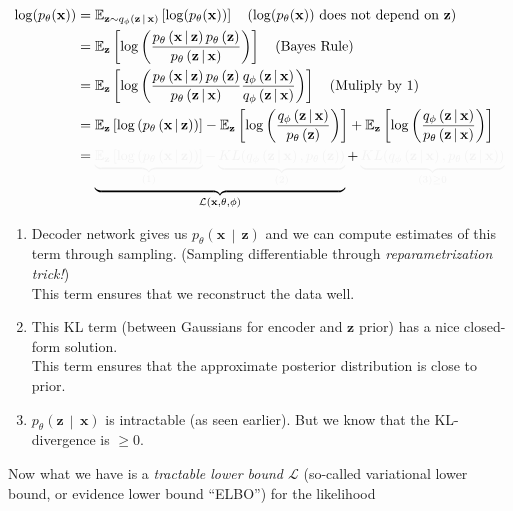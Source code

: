 \documentclass[a2paper,4pt]{extarticle}
\makeatletter
\newcommand{\tcb}[1]{\textcolor{lighttext}{#1}}
\newcommand{\tcb}[1]{\textcolor{blue}{#1}}
\def\mc#1#{\@mc{#1}}
\def\@mc#1#2#3{%
  \protect\leavevmode
  \begingroup
    \color#1{#2}#3%
  \endgroup
}
\newcommand{\mcr}[1]{\mc{lighttext}{#1}}
\newcommand{\mcg}[1]{\mc{lighttext}{#1}}
\newcommand{\mcr}[1]{\mc{red}{#1}}
\newcommand{\mcg}[1]{\mc{green}{#1}}
\newcommand{\cL}{\mathcal{L}}
\newcommand{\Dist}[2]{#1\left( #2 \right)}
\newcommand{\cDist}[3]{#1\left( #2 \,\middle|\, #3 \right)}
\newcommand{\Exp}[2][]{{\mathbb{E}_{#1}}\left[ #2
\right]}
\renewcommand{\vec}[1]{\mathbf{#1}}
\newcommand{\vx}{\vec{x}}
\newcommand{\vz}{\vec{z}}
\makeatother
\begin{document}
\begin{landscape}
\begin{multicols*}{7}
\begin{gather*}
\begin{align*}
\log(p_\theta(\vx))
&=\Exp[\vz\sim \cDist{q_\phi}{\vz}{\vx}]{\log(p_\theta(\vx))}
\quad (\log(p_\theta(\vx))\text{ does not depend on $\vz$})
\\
&=
\Exp[\vz]{
\log\left(
\frac{
\cDist{p_\theta}{\vx}{\vz}\Dist{p_\theta}{\vz}
}{
\cDist{p_\theta}{\vz}{\vx}
}
\right)
}
\quad(\text{Bayes Rule})
\\
&=
\Exp[\vz]{
\log\left(
\frac{
\cDist{p_\theta}{\vx}{\vz}\Dist{p_\theta}{\vz}
}{
\cDist{p_\theta}{\vz}{\vx}
}
\frac{\cDist{q_\phi}{\vz}{\vx}}{\cDist{q_\phi}{\vz}{\vx}}
\right)
}
\quad(\text{Muliply by 1})
\\
&=
\Exp[\vz]{\log\left(\cDist{p_\theta}{\vx}{\vz}\right)}
-
\Exp[\vz]{\log\left(
\frac{
\cDist{q_\phi}{\vz}{\vx}
}{
\Dist{p_\theta}{\vz}
}
\right)}
+
\Exp[\vz]{\log\left(
\frac{
\cDist{q_\phi}{\vz}{\vx}
}{
\cDist{p_\theta}{\vz}{\vx}
}
\right)}
\\
&=
\underbrace{
\mcg{\underbrace{\Exp[\vz]{\log\left(\cDist{p_\theta}{\vx}{\vz}\right)}}_{(1)}
-
\underbrace{KL(\cDist{q_\phi}{\vz}{\vx},\Dist{p_\theta}{\vz})}_{(2)}}
}_{\cL(\vx,\theta,\phi)}
+
\mcr{
\underbrace{KL(\cDist{q_\phi}{\vz}{\vx},\cDist{p_\theta}{\vz}{\vx})}_{(3)\geq 0}
}
\end{align*}
\end{gather*}

\begin{enumerate}[label=(\arabic*)]
  \item Decoder network gives us $\cDist{p_\theta}{\vx}{\vz}$ and we can compute
  estimates of this term through sampling. (Sampling differentiable through
  \emph{reparametrization trick!})\\
  This term ensures that we reconstruct the data well.
  \item This KL term (between Gaussians for encoder and $\vz$ prior) has a nice
  closed-form solution.\\

  This term ensures that the approximate posterior distribution is close to
  prior.
  \item $\cDist{p_\theta}{\vz}{\vx}$ is intractable (as seen earlier). But we
  know that the KL-divergence is $\geq 0$.
\end{enumerate}

Now what we have is a \emph{tractable lower bound $\cL$} (so-called
\tcb{variational lower bound, or evidence lower bound ``ELBO''}) for the
likelihood


\end{multicols*}
\end{landscape}
\end{document}
